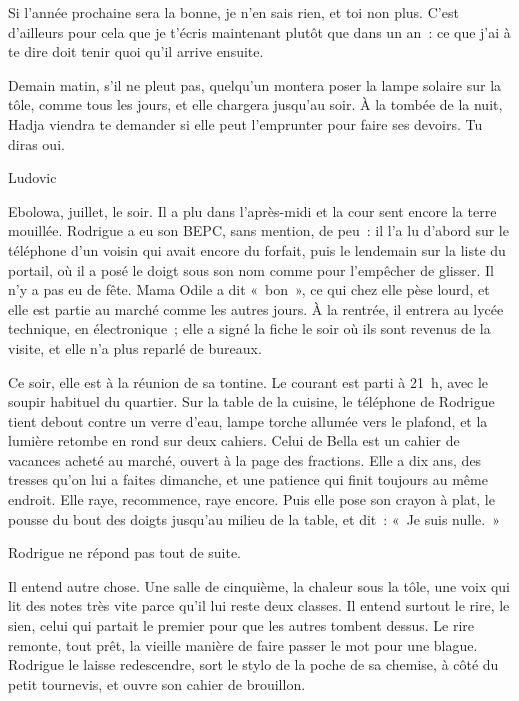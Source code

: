 \documentclass[10.5pt,twoside,openright]{book}
\newcommand{\chapitresn}[1]{\cleardoublepage\markright{#1}\thispagestyle{plain}\vspace*{2.8cm}{\noindent\LARGE\bfseries #1\par}\vspace{1.6em}\noindent\ignorespaces}
\begin{document}
Si l’année prochaine sera la bonne, je n’en sais rien, et toi non plus. C’est d’ailleurs pour cela que je t’écris maintenant plutôt que dans un an : ce que j’ai à te dire doit tenir quoi qu’il arrive ensuite.

Demain matin, s’il ne pleut pas, quelqu’un montera poser la lampe solaire sur la tôle, comme tous les jours, et elle chargera jusqu’au soir. À la tombée de la nuit, Hadja viendra te demander si elle peut l’emprunter pour faire ses devoirs. Tu diras oui.

Ludovic


\chapitresn{Épilogue — Le mot, encore}

Ebolowa, juillet, le soir. Il a plu dans l’après-midi et la cour sent encore la terre mouillée. Rodrigue a eu son BEPC, sans mention, de peu : il l’a lu d’abord sur le téléphone d’un voisin qui avait encore du forfait, puis le lendemain sur la liste du portail, où il a posé le doigt sous son nom comme pour l’empêcher de glisser. Il n’y a pas eu de fête. Mama Odile a dit « bon », ce qui chez elle pèse lourd, et elle est partie au marché comme les autres jours. À la rentrée, il entrera au lycée technique, en électronique ; elle a signé la fiche le soir où ils sont revenus de la visite, et elle n’a plus reparlé de bureaux.

Ce soir, elle est à la réunion de sa tontine. Le courant est parti à 21 h, avec le soupir habituel du quartier. Sur la table de la cuisine, le téléphone de Rodrigue tient debout contre un verre d’eau, lampe torche allumée vers le plafond, et la lumière retombe en rond sur deux cahiers. Celui de Bella est un cahier de vacances acheté au marché, ouvert à la page des fractions. Elle a dix ans, des tresses qu’on lui a faites dimanche, et une patience qui finit toujours au même endroit. Elle raye, recommence, raye encore. Puis elle pose son crayon à plat, le pousse du bout des doigts jusqu’au milieu de la table, et dit : « Je suis nulle. »

Rodrigue ne répond pas tout de suite.

Il entend autre chose. Une salle de cinquième, la chaleur sous la tôle, une voix qui lit des notes très vite parce qu’il lui reste deux classes. Il entend surtout le rire, le sien, celui qui partait le premier pour que les autres tombent dessus. Le rire remonte, tout prêt, la vieille manière de faire passer le mot pour une blague. Rodrigue le laisse redescendre, sort le stylo de la poche de sa chemise, à côté du petit tournevis, et ouvre son cahier de brouillon.
\end{document}
